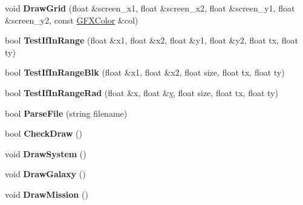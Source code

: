 \begin{DoxyCompactItemize}
\item 
void {\bfseries Draw\+Grid} (float \&screen\+\_\+x1, float \&screen\+\_\+x2, float \&screen\+\_\+y1, float \&screen\+\_\+y2, const \hyperlink{structGFXColor}{G\+F\+X\+Color} \&col)\hypertarget{classNavigationSystem_aed226c24f4f924c904feff7109d6ea90}{}\label{classNavigationSystem_aed226c24f4f924c904feff7109d6ea90}

\item 
bool {\bfseries Test\+If\+In\+Range} (float \&x1, float \&x2, float \&y1, float \&y2, float tx, float ty)\hypertarget{classNavigationSystem_af3831fe3414c6057734e601a41df87d5}{}\label{classNavigationSystem_af3831fe3414c6057734e601a41df87d5}

\item 
bool {\bfseries Test\+If\+In\+Range\+Blk} (float \&x1, float \&x2, float size, float tx, float ty)\hypertarget{classNavigationSystem_a7b4c7d7568bc840b674b8b2a49976a1f}{}\label{classNavigationSystem_a7b4c7d7568bc840b674b8b2a49976a1f}

\item 
bool {\bfseries Test\+If\+In\+Range\+Rad} (float \&x, float \&\hyperlink{IceUtils_8h_aa7ffaed69623192258fb8679569ff9ba}{y}, float size, float tx, float ty)\hypertarget{classNavigationSystem_a16af102ded7ea2e77ceba81ed153c13c}{}\label{classNavigationSystem_a16af102ded7ea2e77ceba81ed153c13c}

\item 
bool {\bfseries Parse\+File} (string filename)\hypertarget{classNavigationSystem_aedf496a174a7281e37efb1c3777eff1b}{}\label{classNavigationSystem_aedf496a174a7281e37efb1c3777eff1b}

\item 
bool {\bfseries Check\+Draw} ()\hypertarget{classNavigationSystem_a167717cbf29b5010b668b2a03d6f4be5}{}\label{classNavigationSystem_a167717cbf29b5010b668b2a03d6f4be5}

\item 
void {\bfseries Draw\+System} ()\hypertarget{classNavigationSystem_a8983dd7a8093ee777c35ac0cdcdbe144}{}\label{classNavigationSystem_a8983dd7a8093ee777c35ac0cdcdbe144}

\item 
void {\bfseries Draw\+Galaxy} ()\hypertarget{classNavigationSystem_ac1831462bfb0884850a50ae7faa4c155}{}\label{classNavigationSystem_ac1831462bfb0884850a50ae7faa4c155}

\item 
void {\bfseries Draw\+Mission} ()\hypertarget{classNavigationSystem_accb4efb5dfd15364fcddb9bff6269b58}{}\label{classNavigationSystem_accb4efb5dfd15364fcddb9bff6269b58}


\end{DoxyCompactItemize}
